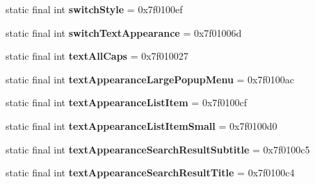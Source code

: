\begin{DoxyCompactItemize}
\item 
\hypertarget{classandroid_1_1support_1_1v7_1_1appcompat_1_1_r_1_1attr_a5707a72d4574ca65a318099dd8101d59}{}static final int {\bfseries switch\+Style} = 0x7f0100ef\label{classandroid_1_1support_1_1v7_1_1appcompat_1_1_r_1_1attr_a5707a72d4574ca65a318099dd8101d59}

\item 
\hypertarget{classandroid_1_1support_1_1v7_1_1appcompat_1_1_r_1_1attr_af5a40cefa1117378a67f11a74d605a6b}{}static final int {\bfseries switch\+Text\+Appearance} = 0x7f01006d\label{classandroid_1_1support_1_1v7_1_1appcompat_1_1_r_1_1attr_af5a40cefa1117378a67f11a74d605a6b}

\item 
\hypertarget{classandroid_1_1support_1_1v7_1_1appcompat_1_1_r_1_1attr_a4a60809d06170629404a0a766aad785e}{}static final int {\bfseries text\+All\+Caps} = 0x7f010027\label{classandroid_1_1support_1_1v7_1_1appcompat_1_1_r_1_1attr_a4a60809d06170629404a0a766aad785e}

\item 
\hypertarget{classandroid_1_1support_1_1v7_1_1appcompat_1_1_r_1_1attr_a74709df50c1106d494db194f4d3b6c0c}{}static final int {\bfseries text\+Appearance\+Large\+Popup\+Menu} = 0x7f0100ac\label{classandroid_1_1support_1_1v7_1_1appcompat_1_1_r_1_1attr_a74709df50c1106d494db194f4d3b6c0c}

\item 
\hypertarget{classandroid_1_1support_1_1v7_1_1appcompat_1_1_r_1_1attr_ad63a659a75f2e87efb7d90fec4edd4b5}{}static final int {\bfseries text\+Appearance\+List\+Item} = 0x7f0100cf\label{classandroid_1_1support_1_1v7_1_1appcompat_1_1_r_1_1attr_ad63a659a75f2e87efb7d90fec4edd4b5}

\item 
\hypertarget{classandroid_1_1support_1_1v7_1_1appcompat_1_1_r_1_1attr_abda379e68781ab8c707c66b040ac9a62}{}static final int {\bfseries text\+Appearance\+List\+Item\+Small} = 0x7f0100d0\label{classandroid_1_1support_1_1v7_1_1appcompat_1_1_r_1_1attr_abda379e68781ab8c707c66b040ac9a62}

\item 
\hypertarget{classandroid_1_1support_1_1v7_1_1appcompat_1_1_r_1_1attr_a2651df0f5401849b71cff71b656297fe}{}static final int {\bfseries text\+Appearance\+Search\+Result\+Subtitle} = 0x7f0100c5\label{classandroid_1_1support_1_1v7_1_1appcompat_1_1_r_1_1attr_a2651df0f5401849b71cff71b656297fe}

\item 
\hypertarget{classandroid_1_1support_1_1v7_1_1appcompat_1_1_r_1_1attr_a910447f9a3116783170bf3da8baf3666}{}static final int {\bfseries text\+Appearance\+Search\+Result\+Title} = 0x7f0100c4\label{classandroid_1_1support_1_1v7_1_1appcompat_1_1_r_1_1attr_a910447f9a3116783170bf3da8baf3666}


\end{DoxyCompactItemize}
